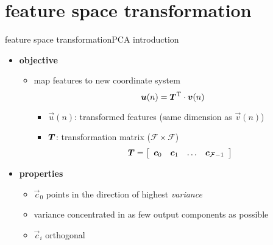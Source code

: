     \section[mapping]{feature space transformation}
		\begin{frame}{feature space transformation}{PCA introduction}
            \begin{itemize}
                \item   \textbf{objective}
                    \begin{itemize}
                        \item   map features to new coordinate system
                            \begin{equation*}\label{eq:pca_an}
                                \vec{u}(n) = \mat{T}^\mathrm{T}\cdot\vec{v}(n) 
                            \end{equation*}
                            \begin{itemize}
                                \item   $\vec{u}(n)$: transformed features (same dimension as $\vec{v}(n)$)
                                \item   $\mat{T}$: transformation matrix ($\mathcal{F}\times\mathcal{F}$)	
                                    \begin{equation*}
                                        \mat{T} =   \left[ 
                                                        \begin{array}{cccc}
                                                        \vec{c}_0 & \vec{c}_1 & \ldots & \vec{c}_{\mathcal{F}-1}\\
                                                        \end{array}  
                                                    \right] 
                                    \end{equation*}
                            \end{itemize}
                    \end{itemize}
                \item<2->   \textbf{properties}
                    \begin{itemize}
                        \item	$\vec{c}_0$ points in the direction of  highest \emph{variance}
                        \item<2->	variance concentrated in as few output components as possible
                        \item<2->	$\vec{c}_i$ orthogonal

\end{itemize}
\end{itemize}
\end{frame}
